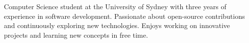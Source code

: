 

\begin{cvparagraph}

Computer Science student at the University of Sydney with three years of experience in software development.
Passionate about open-source contributions and continuously exploring new technologies.
Enjoys working on innovative projects and learning new concepts in free time.

\end{cvparagraph}

